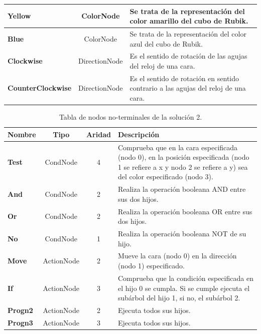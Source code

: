 \begin{table}[ctb]
\begin{tabular}{lcp{8cm}}
\textbf{Yellow}&	ColorNode&	Se trata de la representación del color amarillo del
cubo de Rubik.\\\hline 
\textbf{Blue}	&ColorNode&	Se trata de la representación del color azul del cubo
de Rubik.\\\hline 
\textbf{Clockwise}&	DirectionNode&	Es el sentido de rotación de las agujas del
reloj de una cara. \\\hline 
\textbf{CounterClockwise}	&DirectionNode&	Es el sentido de rotación en sentido
contrario a las agujas del reloj de una cara.\\
\bottomrule
\end{tabular}
\end{table}

\begin{table}[ctb]
\caption{Tabla de nodos no-terminales de la solución 2.}
\label{tab:n-noterminales-sol2}
\centering
\begin{tabular}{lccp{8cm}}
\toprule
\textbf{Nombre} &\textbf{Tipo}&\textbf{Aridad}& \textbf{Descripción}\\
\midrule
\textbf{Test}	&CondNode&4&	Comprueba que en la cara especificada (nodo 0), en la
posición especificada (nodo 1 se refiere a x  y nodo 2 se refiere a  y) sea del color especificado (nodo 3).\\\hline 
\textbf{And}	&CondNode&2&Realiza la operación booleana AND entre sus dos
hijos.\\\hline
\textbf{Or}	&CondNode&2&Realiza la operación booleana OR entre sus dos
hijos.\\\hline \textbf{No}	&CondNode&1&Realiza la operación booleana NOT de su hijo.\\\hline 
\textbf{Move}	&ActionNode&2&Mueve la cara (nodo 0) en la dirección (nodo 1)
especificado.\\\hline 
\textbf{If}	&ActionNode&3&	Comprueba que la condición especificada en el hijo 0
se cumpla. Si se cumple ejecuta el subárbol del hijo 1, si no, el subárbol 2.\\\hline 
\textbf{Progn2}	&ActionNode&2&	Ejecuta todos sus hijos.\\\hline 
\textbf{Progn3}	&ActionNode&3&	Ejecuta todos sus hijos.\\
\bottomrule
\end{tabular}
\end{table}

